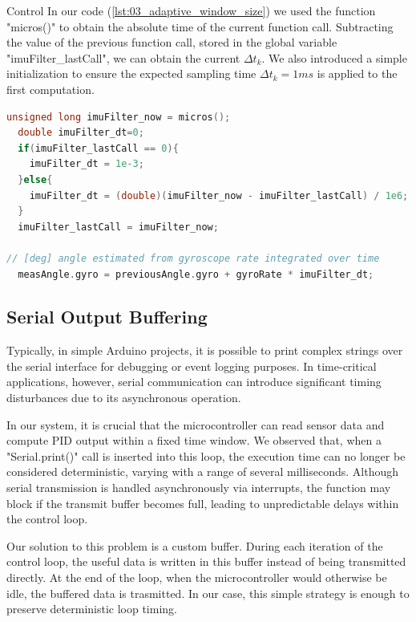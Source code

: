 \begin{chapter}{Control}
\noindent
In our code (\ref{lst:03_adaptive_window_size}) we used the function "micros()" to obtain the absolute time of the current function call. Subtracting the value of the previous function call, stored in the global variable "imuFilter\_lastCall", we can obtain the current $\Delta t_k$.
We also introduced a simple initialization to ensure the expected sampling time $\Delta t_k = 1 ms$ is applied to the first computation.

\begin{lstlisting}[language=C, caption=Adaptive Window Size, label=lst:03_adaptive_window_size, style=c_style]
unsigned long imuFilter_now = micros();
  double imuFilter_dt=0;
  if(imuFilter_lastCall == 0){
    imuFilter_dt = 1e-3;
  }else{
    imuFilter_dt = (double)(imuFilter_now - imuFilter_lastCall) / 1e6;
  }
  imuFilter_lastCall = imuFilter_now;

// [deg] angle estimated from gyroscope rate integrated over time
  measAngle.gyro = previousAngle.gyro + gyroRate * imuFilter_dt;
\end{lstlisting}


\subsection{Serial Output Buffering}
Typically, in simple Arduino projects, it is possible to print complex strings over the serial interface for debugging or event logging purposes. In time-critical applications, however, serial communication can introduce significant timing disturbances due to its asynchronous operation.

In our system, it is crucial that the microcontroller can read sensor data and compute PID output within a fixed time window. We observed that, when a "Serial.print()" call is inserted into this loop, the execution time can no longer be considered deterministic, varying with a range of several milliseconds. Although serial transmission is handled asynchronously via interrupts, the function may block if the transmit buffer becomes full, leading to unpredictable delays within the control loop.

Our solution to this problem is a custom buffer. During each iteration of the control loop, the useful data is written in this buffer instead of being transmitted directly. At the end of the loop, when the microcontroller would otherwise be idle, the buffered data is trasmitted. In our case, this simple strategy is enough to preserve deterministic loop timing.



\end{chapter}